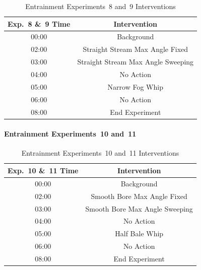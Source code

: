 \documentclass[12pt,oneside]{book}
\begin{document}
\begin{table}[H]
	\centering
	\caption{Entrainment Experiments~8 and~9 Interventions}
	\begin{tabular}{|c|c|} 
		\hline
		Exp.~8 \&~9 Time 	& 	Intervention 	\\ \hline \hline
			00:00 	 		&	Background 	\\ \hline
			02:00 			&	Straight Stream Max Angle Fixed 	\\ \hline
			03:00 			&	Straight Stream Max Angle Sweeping 	\\ \hline
			04:00 			&	No Action 	\\ \hline
			05:00 			&	Narrow Fog Whip 	\\ \hline
			06:00 			&	No Action 	\\ \hline
			08:00 			&	End Experiment 	\\ \hline
	\end{tabular}
	\label{Table:EntExp8_and_9_Interventions}
\end{table}

\FloatBarrier

\paragraph{Entrainment Experiments~10 and~11} \mbox{}


\begin{table}[H]
	\centering
	\caption{Entrainment Experiments~10 and~11 Interventions}
	\begin{tabular}{|c|c|} 
		\hline
		Exp.~10 \&~11 Time 	& 	Intervention 	\\ \hline \hline
			00:00 	 		&	Background 	\\ \hline
			02:00 			&	Smooth Bore Max Angle Fixed 	\\ \hline
			03:00 			&	Smooth Bore Max Angle Sweeping 	\\ \hline
			04:00 			&	No Action 	\\ \hline
			05:00 			&	Half Bale Whip 	\\ \hline
			06:00 			&	No Action 	\\ \hline
			08:00 			&	End Experiment 	\\ \hline
	\end{tabular}
	\label{Table:EntExp10_and_11_Interventions}
\end{table}
\end{document}
